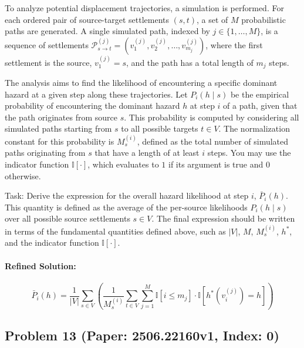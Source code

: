 \documentclass[10pt]{article}
\begin{document}
To analyze potential displacement trajectories, a simulation is performed. For each ordered pair of source-target settlements $(s, t)$, a set of $M$ probabilistic paths are generated. A single simulated path, indexed by $j \in \{1, \dots, M\}$, is a sequence of settlements $\mathcal{P}^{(j)}_{s \to t} = (v^{(j)}_1, v^{(j)}_2, \dots, v^{(j)}_{m_j})$, where the first settlement is the source, $v^{(j)}_1 = s$, and the path has a total length of $m_j$ steps.

The analysis aims to find the likelihood of encountering a specific dominant hazard at a given step along these trajectories. Let $P_i(h \mid s)$ be the empirical probability of encountering the dominant hazard $h$ at step $i$ of a path, given that the path originates from source $s$. This probability is computed by considering all simulated paths starting from $s$ to all possible targets $t \in V$. The normalization constant for this probability is $M_s^{(i)}$, defined as the total number of simulated paths originating from $s$ that have a length of at least $i$ steps. You may use the indicator function $\mathbb{I}[\cdot]$, which evaluates to $1$ if its argument is true and $0$ otherwise.

Task:
Derive the expression for the overall hazard likelihood at step $i$, $\bar{P}_i(h)$. This quantity is defined as the average of the per-source likelihoods $P_i(h \mid s)$ over all possible source settlements $s \in V$. The final expression should be written in terms of the fundamental quantities defined above, such as $|V|$, $M$, $M_s^{(i)}$, $h^*$, and the indicator function $\mathbb{I}[\cdot]$.


\paragraph*{Refined Solution:}
\[ \bar{P}_i(h) = \frac{1}{|V|} \sum_{s \in V} \left( \frac{1}{M_s^{(i)}} \sum_{t \in V} \sum_{j=1}^{M} \mathbb{I}[i \leq m_j] \cdot \mathbb{I}[h^*(v^{(j)}_i) = h] \right) \]

\newpage
\subsection*{Problem 13 (Paper: 2506.22160v1, Index: 0)}
\end{document}
